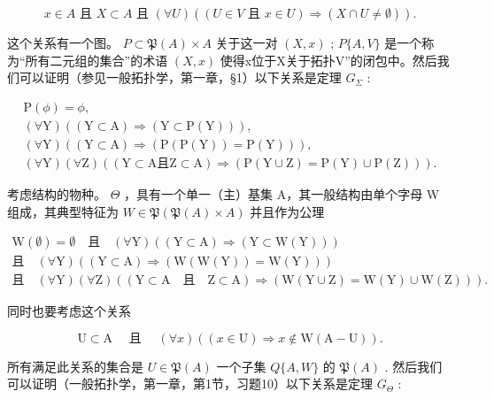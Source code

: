 \[
x \in A \text {   且   } X \subset A \text {   且   } (\forall U) ((U \in V \text {   且   } x \in U) \Longrightarrow (X \cap U \neq \emptyset)).
\]

这个关系有一个图。 \(P \subset \mathfrak{P}(A) \times A\) 关于这一对 \((X, x)\) ; \(P\{A, V\}\) 是一个称为“所有二元组的集合”的术语 \((X, x)\) 使得x位于X关于拓扑V''的闭包中。然后我们可以证明（参见一般拓扑学，第一章，§1）以下关系是定理 \(G_{\Sigma}\) :

\[
\begin{array}{c} \mathrm{P} (\phi) = \phi , \\ (\forall \mathrm{Y}) ((\mathrm{Y} \subset \mathrm{A}) \Longrightarrow (\mathrm{Y} \subset \mathrm{P} (\mathrm{Y}))), \\ (\forall \mathrm{Y}) ((\mathrm{Y} \subset \mathrm{A}) \Longrightarrow (\mathrm{P} (\mathrm{P} (\mathrm{Y})) = \mathrm{P} (\mathrm{Y}))), \\ (\forall \mathrm{Y}) (\forall \mathrm{Z}) ((\mathrm{Y} \subset \mathrm{A} \text {且} \mathrm{Z} \subset \mathrm{A}) \Longrightarrow (\mathrm{P} (\mathrm{Y} \cup \mathrm{Z}) = \mathrm{P} (\mathrm{Y}) \cup \mathrm{P} (\mathrm{Z}))). \end{array}
\]

考虑结构的物种。 \(\Theta\) ，具有一个单一（主）基集 A，其一般结构由单个字母 W 组成，其典型特征为 \(W \in \mathfrak{P}(\mathfrak{P}(A) \times A)\) 并且作为公理

\[
\begin{array}{c} \mathrm{W} (\emptyset) = \emptyset \quad \text {且} \quad (\forall \mathrm{Y}) ((\mathrm{Y} \subset \mathrm{A}) \Longrightarrow (\mathrm{Y} \subset \mathrm{W} (\mathrm{Y}))) \\ \text {且} \quad (\forall \mathrm{Y}) ((\mathrm{Y} \subset \mathrm{A}) \Longrightarrow (\mathrm{W} (\mathrm{W} (\mathrm{Y})) = \mathrm{W} (\mathrm{Y}))) \\ \text {且} \quad (\forall \mathrm{Y}) (\forall \mathrm{Z}) ((\mathrm{Y} \subset \mathrm{A} \quad \text {且} \quad \mathrm{Z} \subset \mathrm{A}) \Longrightarrow (\mathrm{W} (\mathrm{Y} \cup \mathrm{Z}) = \mathrm{W} (\mathrm{Y}) \cup \mathrm{W} (\mathrm{Z}))). \end{array}
\]

同时也要考虑这个关系

\[
\mathrm{U} \subset \mathrm{A} \quad \text { 且 } \quad (\forall x) ((x \in \mathrm{U}) \Longrightarrow x \notin \mathrm{W} (\mathrm{A} - \mathrm{U})).
\]

所有满足此关系的集合是 \(U \in \mathfrak{P}(A)\) 一个子集 \(Q\{A, W\}\) 的 \(\mathfrak{P}(A)\) . 然后我们可以证明（一般拓扑学，第一章，第1节，习题10）以下关系是定理 \(G_{\Theta}\) :

